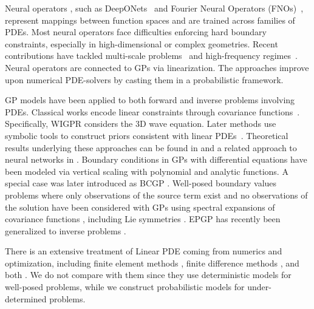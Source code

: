 \documentclass{article} %
\theoremstyle{plain}
\theoremstyle{definition}
\theoremstyle{remark}
\begin{document}
Neural operators \citep{kovachki2023neural}, such as DeepONets~\citep{Lu2021deeponet} and Fourier Neural Operators (FNOs)~\citep{Li2021}, represent mappings between function spaces and are trained across families of PDEs. Most neural operators face difficulties enforcing hard boundary constraints, especially in high-dimensional or complex geometries.
Recent contributions have tackled multi-scale problems~\citep{Fang2023solving} and high-frequency regimes~\citep{raonic2024convolutional}.
Neural operators are connected to GPs \citep{magnani2024linearization} via linearization.
The approaches \citep{hennig2015probabilistic,pfortner2022physics,schober2014probabilistic,zhang2025monte} improve upon numerical PDE-solvers by casting them in a pro\-babilis\-tic framework.

GP models have been applied to both forward and inverse problems involving PDEs. Classical works encode linear constraints through covariance functions~\citep{MacedoCastro2008,MagneticFieldGP,sarkka2011linear}. Specifically, WIGPR \citep{henderson2021stochastic} considers the 3D wave equation. Later methods use symbolic tools to construct priors consistent with linear PDEs~\citep{jidling2018probabilistic,LH_AlgorithmicLinearlyConstrainedGaussianProcesses,LinearlyConstrainedGP}.
Theoretical results underlying these approaches can be found in \citep{henderson2023characterization,sullivan2024hille} and a related approach to neural networks in \citep{hendriks2020linearly,ranftl2023physics}.
Boundary conditions in GPs with differential equations have been modeled via vertical scaling with polynomial \citep{LH_AlgorithmicLinearlyConstrainedGaussianProcessesBoundaryConditions} and analytic 
\citep{langehegermann2022boundary} functions.
A special case was later introduced as BCGP \citep{dalton2024boundary}.
Well-posed boundary values problems where only observations of the source term exist and no observations of the solution have been considered with GPs using spectral expansions of covariance functions \citep{gulian2022gaussian}, including Lie symmetries \citep{dalton2024physics}.
EPGP has recently been generalized to inverse problems \citep{li2025gaussian}.

There is an extensive treatment of Linear PDE coming from numerics and optimization, including finite element methods   \citep{larson2013finite,logan2011first,johnson2009numerical,brenner2008mathematical,braess2001finite}, finite difference methods \citep{ervedoza2012wave,zuazua2005propagation,langtangen2016finite,langtangen2017finite,thomas2013numerical}, and both \citep{cohen2017finite,mazumder2015numerical,ames2014numerical,esfandiari2017numerical}. We do not compare with them since they use deterministic models for well-posed problems, while we construct probabilistic models for under-determined problems.%
\end{document}
